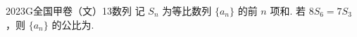 
\begin{problem}{2023}{G}{全国甲卷（文）}{13}{数列}
记 $S_n$ 为等比数列 $\{a_n\}$ 的前 $n$ 项和. 若 $8S_6=7S_3$，则 $\{a_n\}$ 的公比为\underline{\hspace{4em}}.
\end{problem}
